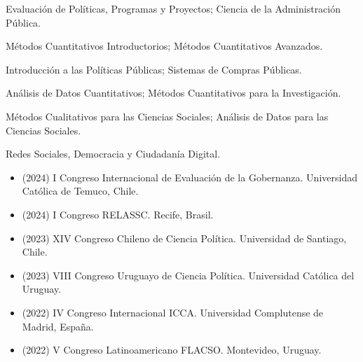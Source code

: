 \documentclass[10pt,letterpaper]{article}
\begin{document}

\hspace{2.5em}Evaluación de Políticas, Programas y Proyectos; Ciencia de la Administración Pública.

\vspace{2pt}

\hspace{2.5em}Métodos Cuantitativos Introductorios; Métodos Cuantitativos Avanzados.

\vspace{2pt}

\hspace{2.5em}Introducción a las Políticas Públicas; Sistemas de Compras Públicas.

\vspace{2pt}

\hspace{2.5em}Análisis de Datos Cuantitativos; Métodos Cuantitativos para la Investigación.

\vspace{2pt}

\hspace{2.5em}Métodos Cualitativos para las Ciencias Sociales; Análisis de Datos para las Ciencias Sociales.

\vspace{2pt}

\hspace{2.5em}Redes Sociales, Democracia y Ciudadanía Digital.


\begin{itemize}
    \item (2024) I Congreso Internacional de Evaluación de la Gobernanza. Universidad Católica de Temuco, Chile.
    \item (2024) I Congreso RELASSC. Recife, Brasil.
    \item (2023) XIV Congreso Chileno de Ciencia Política. Universidad de Santiago, Chile.
    \item (2023) VIII Congreso Uruguayo de Ciencia Política. Universidad Católica del Uruguay.
    \item (2022) IV Congreso Internacional ICCA. Universidad Complutense de Madrid, España.
    \item (2022) V Congreso Latinoamericano FLACSO. Montevideo, Uruguay.
\end{itemize}
\end{document}
